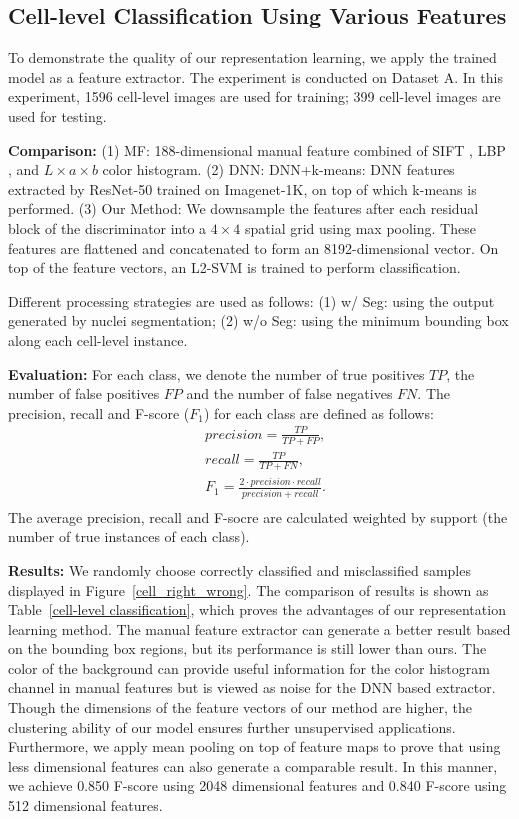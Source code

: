 \documentclass[journal]{IEEEtran}
\begin{document}
\subsection{Cell-level Classification Using Various Features}

To demonstrate the quality of our representation learning, we apply the trained model as a feature extractor. The experiment is conducted on Dataset A. In this experiment, 1596 cell-level images are used for training; 399 cell-level images are used for testing. 

\textbf{Comparison:} (1) MF: 188-dimensional manual feature combined of SIFT \cite{lowe2004distinctive}, LBP \cite{ojala2002multiresolution}, and $L \times a \times b$ color histogram. (2) DNN: DNN+k-means: DNN features extracted by ResNet-50 trained on Imagenet-1K, on top of which k-means is performed. (3) Our Method: We downsample the features after each residual block of the discriminator into a $4 \times 4$ spatial grid using max pooling. These features are flattened and concatenated to form an 8192-dimensional vector. On top of the feature vectors, an L2-SVM is trained to perform classification. 

Different processing strategies are used as follows: (1) w/ Seg: using the output generated by nuclei segmentation; (2) w/o Seg: using the minimum bounding box along each cell-level instance. 

\textbf{Evaluation:} For each class, we denote the number of true positives $TP$, the number of false positives $FP$ and the number of false negatives $FN$. The precision, recall and F-score ($F_1$) for each class are defined as follows: \begin{equation}
\begin{aligned}
& precision=\frac{TP}{TP+FP}, \\
& recall=\frac{TP}{TP+FN}, \\
& F_1 = \frac{2 \cdot precision \cdot recall}{precision + recall}. \\
\end{aligned}
\label{eq:fscore}
\end{equation}The average precision, recall and F-socre are calculated weighted by support (the number of true instances of each class).

\textbf{Results:} We randomly choose correctly classified and misclassified samples displayed in Figure~\ref{cell_right_wrong}. The comparison of results is shown as Table~\ref{cell-level classification}, which proves the advantages of our representation learning method. The manual feature extractor can generate a better result based on the bounding box regions, but its performance is still lower than ours. The color of the background can provide useful information for the color histogram channel in manual features but is viewed as noise for the DNN based extractor. Though the dimensions of the feature vectors of our method are higher, the clustering ability of our model ensures further unsupervised applications. Furthermore, we apply mean pooling on top of feature maps to prove that using less dimensional features can also generate a comparable result. In this manner, we achieve 0.850 F-score using 2048 dimensional features and 0.840 F-score using 512 dimensional features.
\end{document}
